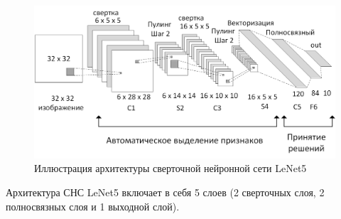 \documentclass[12pt]{article}
\begin{document}
\begin{sloppypar}
\begin{figure}[h]
	\begin{center}
		\includegraphics[width=0.99\linewidth]{./figuresch1/LeNet5_v2.png}
		\caption{Иллюстрация архитектуры сверточной нейронной сети LeNet5}		
		\label{ch1:fig:LeNet5}
	\end{center}
\end{figure}

Архитектура СНС LeNet5 включает в себя 5 слоев (2 сверточных слоя, 2 полносвязных слоя и 1 выходной слой). 


\end{sloppypar}
\end{document}
